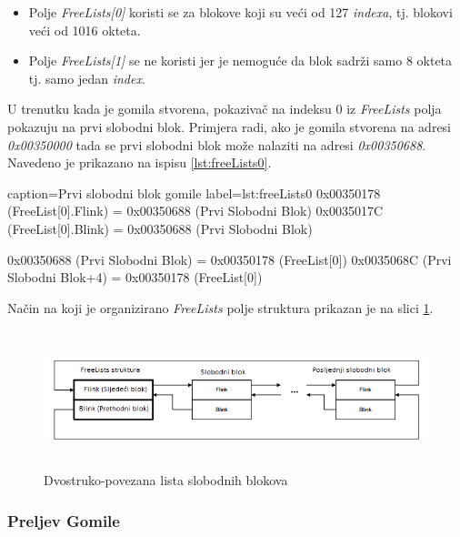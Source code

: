 \documentclass[times, utf8, diplomski, numeric]{fer}
\begin{document}
\begin{itemize}

\item Polje \emph{FreeLists[0]} koristi se za blokove koji su
veći od 127 \emph{indexa}, tj. blokovi veći od 1016 okteta.

\item Polje \emph{FreeLists[1]} se ne koristi jer je nemoguće da
blok sadrži samo 8 okteta tj. samo jedan \emph{index}.

\end{itemize}

U trenutku kada je gomila stvorena, pokazivač na indeksu 0 iz
\emph{FreeLists} polja pokazuju na prvi slobodni blok. Primjera
radi, ako je gomila stvorena na adresi \emph{0x00350000} tada se
prvi slobodni blok može nalaziti na adresi \emph{0x00350688}.
Navedeno je prikazano na ispisu \ref{lst:freeLists0}.

\begin{ispis} {caption=Prvi slobodni blok gomile} {label=lst:freeLists0}
0x00350178 (FreeList[0].Flink) = 0x00350688 (Prvi Slobodni Blok)
0x0035017C (FreeList[0].Blink) = 0x00350688 (Prvi Slobodni Blok)

0x00350688 (Prvi Slobodni Blok) = 0x00350178 (FreeList[0])
0x0035068C (Prvi Slobodni Blok+4) = 0x00350178 (FreeList[0])
\end{ispis}

Način na koji je organizirano \emph{FreeLists} polje struktura
prikazan je na slici \ref{fig:free_lists_entries}.

\begin{figure}[!ht]
\centering
\setlength\fboxsep{0pt}
\setlength\fboxrule{0.5pt}
\includegraphics[width=15cm, height=4cm]{slike/free_lists_entries}
\caption{Dvostruko-povezana lista slobodnih blokova}
\label{fig:free_lists_entries} 
\end{figure}

\subsubsection{Preljev Gomile}
\end{document}
